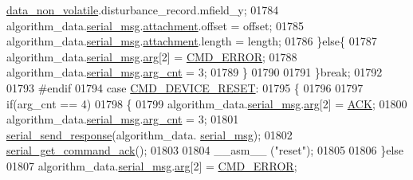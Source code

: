 \begin{DoxyCode}
{{{{{      \hyperlink{a00060_a76ac5f917f5308dcd83de0d7c94559fb}{data\_non\_volatile}.disturbance\_record.mfield\_y;
01784                        algorithm\_data.\hyperlink{a00016_afcf5f557aea688aad985eec15269c1da}{serial\_msg}.\hyperlink{a00031_a040f6d5d58d18d8aeaf447eda7f50172}{attachment}.offset      = offset;
01785                        algorithm\_data.\hyperlink{a00016_afcf5f557aea688aad985eec15269c1da}{serial\_msg}.\hyperlink{a00031_a040f6d5d58d18d8aeaf447eda7f50172}{attachment}.length      = length;
01786                      \}\textcolor{keywordflow}{else}\{
01787                          algorithm\_data.\hyperlink{a00016_afcf5f557aea688aad985eec15269c1da}{serial\_msg}.\hyperlink{a00031_af7d6f762438c80072bd9dc0e4dd4ae1e}{arg}[2]               = 
      \hyperlink{a00021_a1764a522e9c1a59a59be8757c69fa494}{CMD\_ERROR};
01788                          algorithm\_data.\hyperlink{a00016_afcf5f557aea688aad985eec15269c1da}{serial\_msg}.\hyperlink{a00031_a7b79f40e2eeec288091afd340bf8f591}{arg\_cnt}              = 3;
01789                      \}
01790 
01791                 \}\textcolor{keywordflow}{break};
01792 
01793 \textcolor{preprocessor}{#endif}
01794                  \textcolor{keywordflow}{case}   \hyperlink{a00021_ac4c8a78ea50054745a0ac0792baa7657}{CMD\_DEVICE\_RESET}:
01795                 \{
01796 
01797                           \textcolor{keywordflow}{if}(arg\_cnt == 4)
01798                      \{
01799                            algorithm\_data.\hyperlink{a00016_afcf5f557aea688aad985eec15269c1da}{serial\_msg}.\hyperlink{a00031_af7d6f762438c80072bd9dc0e4dd4ae1e}{arg}[2] = \hyperlink{a00021_a6f6489887e08bff4887d0bc5dcf214d8}{ACK};
01800                            algorithm\_data.\hyperlink{a00016_afcf5f557aea688aad985eec15269c1da}{serial\_msg}.\hyperlink{a00031_a7b79f40e2eeec288091afd340bf8f591}{arg\_cnt} = 3;
01801                            \hyperlink{a00031_a96a3f016ca5b0736424c2695fe9fbdf8}{serial\_send\_response}(algorithm\_data.
      \hyperlink{a00016_afcf5f557aea688aad985eec15269c1da}{serial\_msg});
01802                            \hyperlink{a00031_a7fc7421ed15d6e4516e9878e7455d715}{serial\_get\_command\_ack}();
01803                            
01804                            \_\_asm\_\_ (\textcolor{stringliteral}{"reset"});
01805 
01806                          \}\textcolor{keywordflow}{else}
01807                              algorithm\_data.\hyperlink{a00016_afcf5f557aea688aad985eec15269c1da}{serial\_msg}.\hyperlink{a00031_af7d6f762438c80072bd9dc0e4dd4ae1e}{arg}[2] = 
      \hyperlink{a00021_a1764a522e9c1a59a59be8757c69fa494}{CMD\_ERROR};
}}}}}
\end{DoxyCode}
